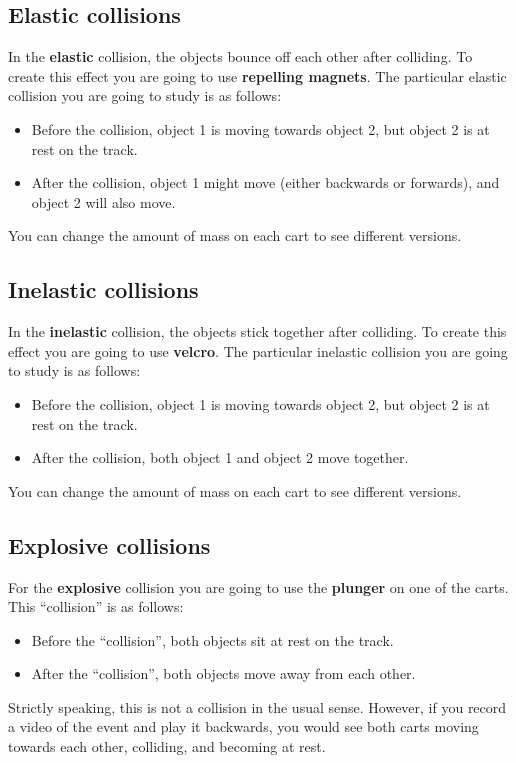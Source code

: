 \subsection{Elastic collisions}
%
In the \textbf{elastic} collision, the objects bounce off each other after colliding. To create this effect you are going to use \textbf{repelling magnets}. The particular elastic collision you are going to study is as follows:
\begin{itemize}
    \item Before the collision, object 1 is moving towards object 2, but object 2 is at rest on the track.
    \item After the collision, object 1 might move (either backwards or forwards), and object 2 will also move.
\end{itemize}
You can change the amount of mass on each cart to see different versions.
%
\subsection{Inelastic collisions}
%
In the \textbf{inelastic} collision, the objects stick together after colliding. To create this effect you are going to use \textbf{velcro}. The particular inelastic collision you are going to study is as follows:
\begin{itemize}
    \item Before the collision, object 1 is moving towards object 2, but object 2 is at rest on the track.
    \item After the collision, both object 1 and object 2 move together.
\end{itemize}
You can change the amount of mass on each cart to see different versions.
%
\subsection{Explosive collisions}
%
For the \textbf{explosive} collision you are going to use the \textbf{plunger} on one of the carts. This ``collision'' is as follows:
\begin{itemize}
    \item Before the ``collision'', both objects sit at rest on the track.
    \item After the ``collision'', both objects move away from each other.
\end{itemize}
Strictly speaking, this is not a collision in the usual sense. However, if you record a video of the event and play it backwards, you would see both carts moving towards each other, colliding, and becoming at rest.

